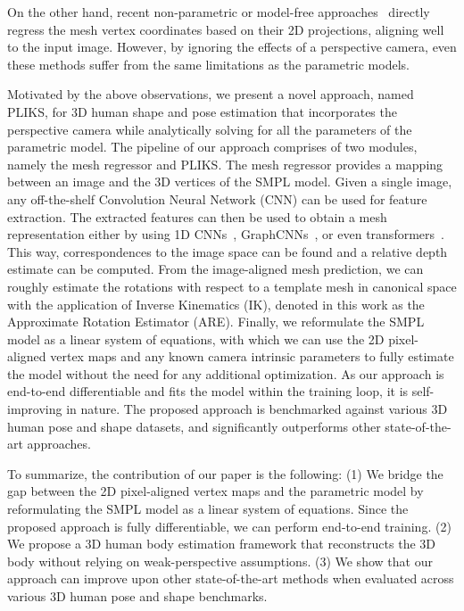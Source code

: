 \documentclass[10pt,twocolumn,letterpaper]{article}
\begin{document}
On the other hand, recent non-parametric or model-free approaches~\cite{meshgraph,i2l}  directly regress the mesh vertex coordinates based on their 2D projections, aligning well to the input image. However, by ignoring the effects of a perspective camera, even these methods suffer from the same limitations as the parametric models. 


Motivated by the above observations, we present a novel approach, named PLIKS, for 3D human shape and pose estimation that incorporates the perspective camera while analytically solving for all the parameters of the parametric model. The pipeline of our approach comprises of two modules, namely the mesh regressor and PLIKS. The mesh regressor provides a mapping between an image and the 3D vertices of the SMPL model. Given a single image, any off-the-shelf Convolution Neural Network (CNN) can be used for feature extraction. The extracted features can then be used to obtain a mesh representation either by using 1D CNNs~\cite{i2l}, GraphCNNs~\cite{gcmr}, or even transformers~\cite{meshgraph}. This way, correspondences to the image space can be found and a relative depth estimate can be computed. From the image-aligned mesh prediction, we can roughly estimate the rotations with respect to a template mesh in canonical space with the application of Inverse Kinematics (IK), denoted in this work as the Approximate Rotation Estimator (ARE).
Finally, we reformulate the SMPL model as a linear system of equations, with which we can use the 2D pixel-aligned vertex maps and any known camera intrinsic parameters to fully estimate the model without the need for any additional optimization. As our approach is end-to-end differentiable and fits the model within the training loop, it is self-improving in nature. The proposed approach is benchmarked against various 3D human pose and shape datasets, and significantly outperforms other state-of-the-art approaches.


To summarize, the contribution of our paper is the following: (1) We bridge the gap between the 2D pixel-aligned vertex maps
and the parametric model by reformulating the SMPL model as a linear system of equations. Since the proposed approach is fully differentiable, we can perform end-to-end training. (2) We propose a 3D human body estimation framework that reconstructs the 3D
body without relying on weak-perspective assumptions. (3) We show that our approach can improve upon other state-of-the-art methods when evaluated across various 3D human pose and shape benchmarks. 
\end{document}
